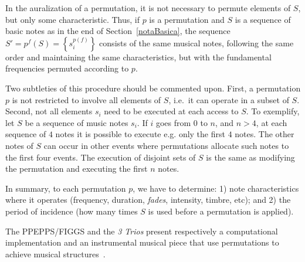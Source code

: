 In the auralization of a permutation, it is not necessary to permute elements of $S$,
but only some characteristic. Thus, if $p$ is a permutation and $S$ is a sequence of basic notes as in the end of Section~\ref{notaBasica}, the
sequence $S'=p^f(S)=\left\{s_i^{p(f)}\right\}$ consists of the same
musical notes, following the same order and maintaining the same characteristics, but with the
fundamental frequencies permuted according to $p$.

Two subtleties of this procedure should be commented upon. 
First, a permutation $p$ is not restricted to involve all elements of $S$, i.e.\ it can operate in a subset of $S$.
Second, not all elements $s_i$ need to be executed at each access to $S$.
To exemplify, let $S$ be a sequence of music notes $s_i$. 
If $i$ goes from $0$ to $n$, and
$n>4$, at each sequence of $4$ notes it is possible to execute e.g. only the first $4$
notes.
The other notes of $S$ can occur in other events where permutations 
allocate such notes to the first four events.
The execution of disjoint sets of $S$
is the same as modifying the permutation and executing the first $n$ notes.

In summary, to each permutation $p$, we have to determine:
1) note characteristics where it operates (frequency, duration, \emph{fades},
intensity, timbre, etc); and
2) the period of incidence (how many times $S$ is used before a permutation is
applied).

The PPEPPS/FIGGS and the \emph{3 Trios} present respectively a computational implementation
and an instrumental musical piece that use
permutations to achieve
musical structures~\cite{MASSA,figgusOriginal,figgusEspacializacao,figgus,3Trios}.

